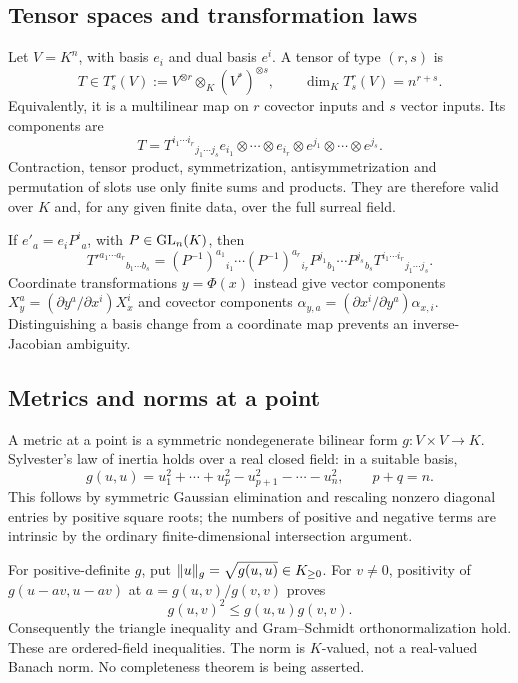 \documentclass[11pt,letterpaper]{article}
\theoremstyle{definition}
\theoremstyle{remark}
\begin{document}
\subsection{Tensor spaces and transformation laws}

Let $V=K^n$, with basis $e_i$ and dual basis $e^i$. A tensor of type $(r,s)$ is
\[
 T\in T^r_s(V):=V^{\otimes r}\otimes_K(V^*)^{\otimes s},
 \qquad \dim_K T^r_s(V)=n^{r+s}.
\]
Equivalently, it is a multilinear map on $r$ covector inputs and $s$ vector
inputs. Its components are
\[
 T=T^{i_1\cdots i_r}{}_{j_1\cdots j_s}
 e_{i_1}\otimes\cdots\otimes e_{i_r}
 \otimes e^{j_1}\otimes\cdots\otimes e^{j_s}.
\]
Contraction, tensor product, symmetrization, antisymmetrization and permutation
of slots use only finite sums and products. They are therefore valid over
$K$ and, for any given finite data, over the full surreal field.

If $e'_a=e_iP^i{}_a$, with $P\in\operatorname{GL}_n(K)$, then
\begin{equation}\label{vtf:eq:transform}
 T'^{a_1\cdots a_r}{}_{b_1\cdots b_s}
 =(P^{-1})^{a_1}{}_{i_1}\cdots(P^{-1})^{a_r}{}_{i_r}
 P^{j_1}{}_{b_1}\cdots P^{j_s}{}_{b_s}
 T^{i_1\cdots i_r}{}_{j_1\cdots j_s}.
\end{equation}
Coordinate transformations $y=\Phi(x)$ instead give vector components
$X_y^a=(\partial y^a/\partial x^i)X_x^i$ and covector components
$\alpha_{y,a}=(\partial x^i/\partial y^a)\alpha_{x,i}$. Distinguishing a
basis change from a coordinate map prevents an inverse-Jacobian ambiguity.

\subsection{Metrics and norms at a point}

A metric at a point is a symmetric nondegenerate bilinear form
$g:V\times V\to K$. Sylvester's law of inertia holds over a real closed
field: in a suitable basis,
\[
 g(u,u)=u_1^2+\cdots+u_p^2-u_{p+1}^2-\cdots-u_n^2,
 \qquad p+q=n.
\]
This follows by symmetric Gaussian elimination and rescaling nonzero diagonal
entries by positive square roots; the numbers of positive and negative terms
are intrinsic by the ordinary finite-dimensional intersection argument.

For positive-definite $g$, put $\lVert u\rVert_g=\sqrt{g(u,u)}\in K_{\ge0}$.
For $v\ne0$, positivity of
$g(u-av,u-av)$ at $a=g(u,v)/g(v,v)$ proves
\[
 g(u,v)^2\le g(u,u)g(v,v).
\]
Consequently the triangle inequality and Gram--Schmidt orthonormalization
hold. These are ordered-field inequalities. The norm is $K$-valued, not a
real-valued Banach norm. No completeness theorem is being asserted.
\end{document}
